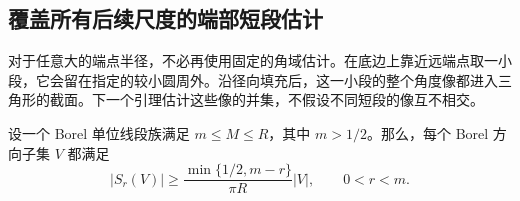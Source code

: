 \subsection{覆盖所有后续尺度的端部短段估计}
\label{subsec:core-tail}

对于任意大的端点半径，不必再使用固定的角域估计。在底边上靠近远端点取一小段，它会留在指定的较小圆周外。沿径向填充后，这一小段的整个角度像都进入三角形的截面。下一个引理估计这些像的并集，不假设不同短段的像互不相交。

\begin{lemma}[远端短段]
\label{lem:core-collar}
设一个 Borel 单位线段族满足 $m\leq M\leq R$，其中 $m>1/2$。那么，每个 Borel 方向子集 $V$ 都满足
\begin{equation}
 |S_r(V)|\geq
 \frac{\min\{1/2,m-r\}}{\pi R}|V|,
                                      \qquad 0<r<m.
\label{eq:core-collar}
\end{equation}
\end{lemma}

